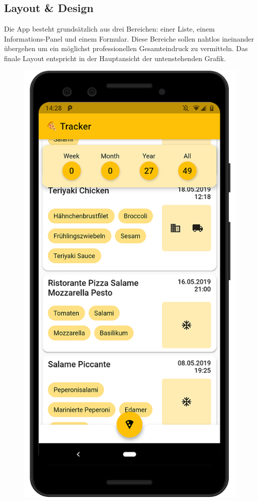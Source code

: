 \subsection{Layout \& Design}

Die App besteht grundsätzlich aus drei Bereichen:
einer Liste, einem Informations-Panel und einem Formular.
Diese Bereiche sollen nahtlos ineinander übergehen um ein
möglichst professionellen Gesamteindruck zu vermitteln.
Das finale Layout entspricht in der Hauptansicht der untenstehenden Grafik.

\begin{figure}[H]
    \vspace{0pt}
        \includegraphics[width=\linewidth]{pixel-3_mockup-1}

\end{figure}
